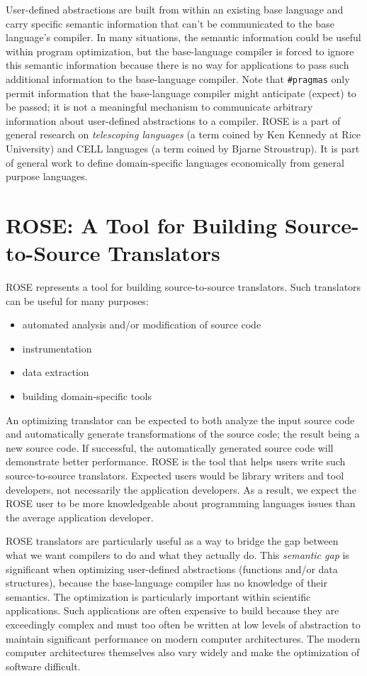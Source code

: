    User-defined abstractions are built from within an existing base language and
carry specific semantic information that can't be communicated to the base
language's compiler.  In many situations, the semantic information could be useful within
program optimization, but the base-language compiler is forced to ignore this semantic 
information because there is no way for applications to pass such additional information 
to the base-language compiler. Note that {\tt \#pragmas} only permit information that the 
base-language compiler might anticipate (expect) to be passed; it is not a meaningful 
mechanism to communicate arbitrary information about user-defined abstractions to a 
compiler.  ROSE is a part of general research on {\em telescoping languages} (a term 
coined by Ken Kennedy at Rice University) and CELL languages (a term coined by 
Bjarne Stroustrup).  It is part of general work to define domain-specific languages
economically from general purpose languages.


\section{ROSE: A Tool for Building Source-to-Source Translators}

   ROSE represents a tool for building source-to-source translators.
Such translators can be useful for many purposes:
\begin{itemize}
   \item automated analysis and/or modification of source code
   \item instrumentation
   \item data extraction
   \item building domain-specific tools
\end{itemize}
An optimizing translator can be expected to both analyze the input 
source code and automatically generate transformations of the source code; the
result being a new source code. If successful, the automatically generated source 
code will demonstrate better performance.  ROSE is the tool that helps users write
such source-to-source translators.  Expected users would be library writers and
tool developers, not necessarily the application developers.  As a result, we expect
the ROSE user to be more knowledgeable about programming languages issues than the 
average application developer.

ROSE translators are particularly useful as a way to bridge the gap between what we want
compilers to do and what they actually do.  This {\em semantic gap} is significant when
optimizing user-defined abstractions (functions and/or data structures), because the
base-language compiler has no knowledge of their semantics.  The optimization
is particularly important within scientific applications.  Such applications are often
expensive to build because they are exceedingly complex and must too often be
written at low levels of abstraction to maintain significant performance on
modern computer architectures.  The modern computer architectures themselves also
vary widely and make the optimization of software difficult.

